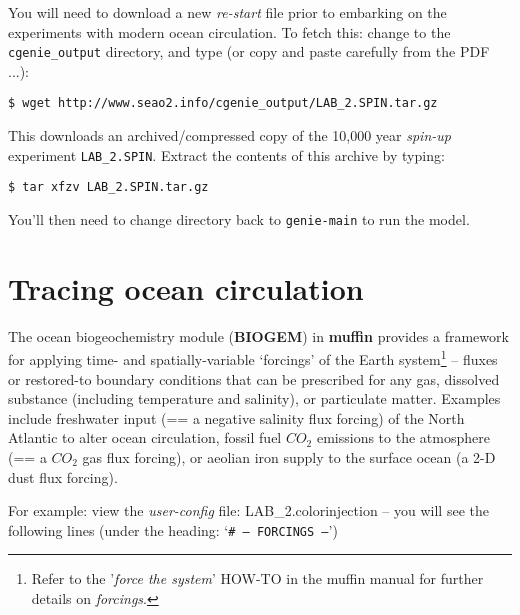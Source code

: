 \documentclass[11pt,fleqn]{book} %
\begin{document}
You will need to download a new \textit{re-start} file prior to embarking on the experiments with modern ocean circulation.
To fetch this: change to the \texttt{cgenie\_output} directory, and type (or copy and paste carefully from the PDF ...):

\vspace{-2mm}
\begin{verbatim}
$ wget http://www.seao2.info/cgenie_output/LAB_2.SPIN.tar.gz
\end{verbatim}
\vspace{-2mm}

This downloads an archived/compressed copy of the 10,000 year \textit{spin-up} experiment \texttt{LAB\_2.SPIN}. Extract the contents of this archive by typing:

\vspace{-2mm}
\begin{verbatim}
$ tar xfzv LAB_2.SPIN.tar.gz
\end{verbatim}
\vspace{-2mm}

You’ll then need to change directory back to \texttt{genie-main} to run the model.


\newpage


\section{Tracing ocean circulation}

The ocean biogeochemistry module (\textbf{BIOGEM}) in \textbf{muffin} provides a framework for applying time- and spatially-variable ‘forcings’ of the Earth system\footnote{Refer to the '\textit{force the system}' \textsf{HOW-TO} in the muffin manual for further details on \textit{forcings}.} – fluxes or restored-to boundary conditions that can be prescribed for any gas, dissolved substance (including temperature and salinity), or particulate matter. Examples include freshwater input (== a negative salinity flux forcing) of the North Atlantic to alter ocean circulation, fossil fuel \(CO_{2}\) emissions to the atmosphere (== a \(CO_{2}\) gas flux forcing), or aeolian iron supply to the surface ocean (a 2-D dust flux forcing).

For example: view the \textit{user-config} file: \textsf{\footnotesize LAB\_2.colorinjection} – you will see the following lines (under the heading: ‘\texttt{\# --- FORCINGS ---}’)
\end{document}
